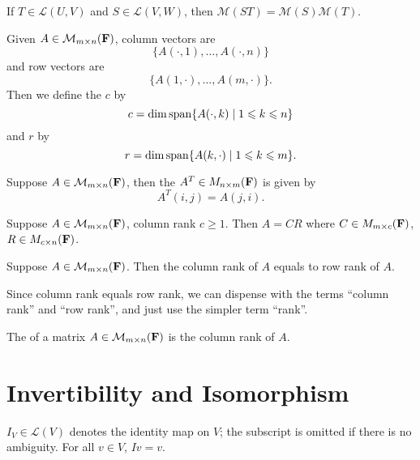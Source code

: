 \begin{proposition}
If $T\in\mathcal{L}(U,V)$ and $S\in\mathcal{L}(V,W)$, then $\mathcal{M}(ST)=\mathcal{M}(S)\mathcal{M}(T)$.
\end{proposition}

\begin{definition}
Given $A\in \mathcal{M}_{m\times n}(\mathbf F)$, column vectors are
\[\{A(\cdot,1),\dots,A(\cdot,n)\}\]
and row vectors are
\[\{A(1,\cdot),\dots,A(m,\cdot)\}.\]
Then we define the  $c$ by
\[c=\dim\operatorname{span}\{A(\cdot,k)\mid1\leqslant k\leqslant n\}\]
and  $r$ by
\[r=\dim\operatorname{span}\{A(k,\cdot)\mid1\leqslant k\leqslant m\}.\]
\end{definition}

\begin{definition}[Transpose]
Suppose $A\in \mathcal{M}_{m\times n}(\mathbf F)$, then the  $A^T\in M_{n\times m}(\mathbf F)$ is given by
\[A^T(i,j)=A(j,i).\]
\end{definition}

\begin{proposition}
Suppose $A\in \mathcal{M}_{m\times n}(\mathbf F)$, column rank $c\ge1$. Then $A=CR$ where $C\in M_{m\times c}(\mathbf F)$, $R\in M_{c\times n}(\mathbf F)$.
\end{proposition}

\begin{proposition}
Suppose $A\in \mathcal{M}_{m\times n}(\mathbf F)$. Then the column rank of $A$ equals to row rank of $A$.
\end{proposition}

Since column rank equals row rank, we can dispense with the terms ``column rank'' and ``row rank'', and just use the simpler
term ``rank''.

\begin{definition}[Rank]
The  of a matrix $A\in \mathcal{M}_{m\times n}(\mathbf F)$ is the column rank of $A$.
\end{definition}
\pagebreak

\section{Invertibility and Isomorphism}
\begin{notation}
$I_V\in\mathcal{L}(V)$ denotes the identity map on $V$; the subscript is omitted if there is no ambiguity. For all $v\in V$, $Iv=v$.
\end{notation}

